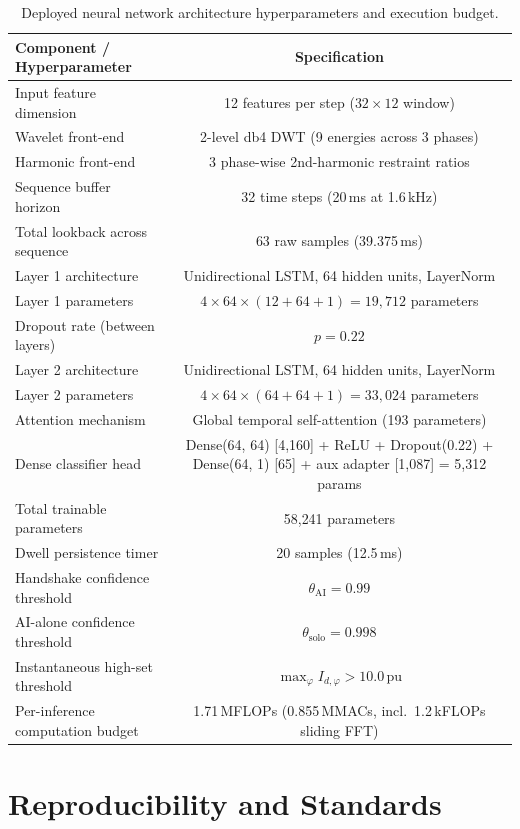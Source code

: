 \documentclass[12pt,a4paper,oneside]{report}
\begin{document}
\begin{table}[H]\centering\caption{Deployed neural network architecture hyperparameters and execution budget.}\label{tab:A.2}
\begin{tabular}{@{}lc@{}}\toprule
\textbf{Component / Hyperparameter} & \textbf{Specification}\\ \midrule
Input feature dimension & 12 features per step ($32\times12$ window)\\
Wavelet front-end & 2-level db4 DWT (9 energies across 3 phases)\\
Harmonic front-end & 3 phase-wise 2nd-harmonic restraint ratios\\
Sequence buffer horizon & 32 time steps (20\,ms at 1.6\,kHz)\\
Total lookback across sequence & 63 raw samples (39.375\,ms)\\
Layer 1 architecture & Unidirectional LSTM, 64 hidden units, LayerNorm\\
Layer 1 parameters & $4\times64\times(12+64+1) = 19{,}712$ parameters\\
Dropout rate (between layers) & $p = 0.22$\\
Layer 2 architecture & Unidirectional LSTM, 64 hidden units, LayerNorm\\
Layer 2 parameters & $4\times64\times(64+64+1) = 33{,}024$ parameters\\
Attention mechanism & Global temporal self-attention (193 parameters)\\
Dense classifier head & Dense(64, 64) [4,160] + ReLU + Dropout(0.22) + Dense(64, 1) [65] + aux adapter [1,087] = 5,312 params\\
Total trainable parameters & 58{,}241 parameters\\
Dwell persistence timer & 20 samples (12.5\,ms)\\
Handshake confidence threshold & $\theta_{\text{AI}} = 0.99$\\
AI-alone confidence threshold & $\theta_{\text{solo}} = 0.998$\\
Instantaneous high-set threshold & $\max_\varphi I_{d,\varphi} > 10.0$\,pu\\
Per-inference computation budget & 1.71\,MFLOPs (0.855\,MMACs, incl.\ 1.2\,kFLOPs sliding FFT)\\ \bottomrule
\end{tabular}\end{table}

\chapter{Reproducibility and Standards}
\end{document}
